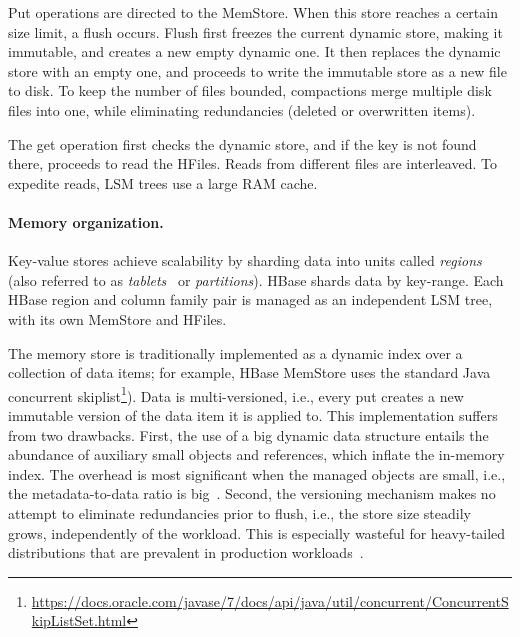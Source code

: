 Put operations are directed to the MemStore.
When this store reaches a certain size limit, a flush occurs. 
Flush first freezes the current dynamic store, making it immutable, and creates a new empty dynamic one.
It then replaces the dynamic store with an empty one, and proceeds to write the immutable store as a new file to disk.
 To keep the number of files bounded, compactions merge multiple disk files into one, while eliminating redundancies 
 (deleted or overwritten items). 

The get operation first checks the dynamic store, and if the key is not found there, proceeds to read the HFiles. 
Reads from different files are interleaved. 
To expedite reads, LSM trees use a large RAM cache. 

\paragraph{Memory organization.}
Key-value stores achieve scalability by sharding data into units called \emph{regions}
(also referred to as \emph{tablets}~\cite{Chang2008, PNUTS2008} or \emph{partitions}).
HBase shards data by key-range.
Each HBase region and column family pair is managed as an independent LSM tree, with its own MemStore and HFiles.

The  memory store is traditionally implemented as a dynamic index over a collection of data items; 
for example,  HBase MemStore uses the standard Java concurrent skiplist\footnote{\small{\url{https://docs.oracle.com/javase/7/docs/api/java/util/concurrent/ConcurrentSkipListSet.html}}}).
Data is multi-versioned, i.e., every put creates a new immutable version of the data item it is applied to. 
%
This implementation suffers from two drawbacks. First, the use of a big dynamic data structure entails 
the abundance of auxiliary small objects and references, which inflate the in-memory index. 
The overhead is most significant when the managed objects
are small, i.e., the metadata-to-data ratio is big~\cite{Wu2015}. Second, the versioning mechanism makes 
no attempt to eliminate redundancies prior to flush, i.e., the store size  steadily grows, independently of the workload. 
This is especially wasteful for heavy-tailed distributions that are prevalent in production workloads~\cite{Devineni:2015}.


